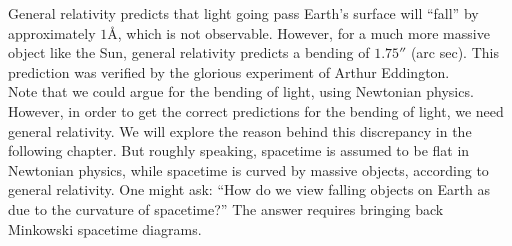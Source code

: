 \documentclass{article}
\theoremstyle{definition}
\begin{document}
General relativity predicts that light going pass Earth's surface will ``fall'' by approximately $1 \text{\AA}$, which is not observable. However, for a much more massive object like the Sun, general relativity predicts a bending of $1.75''$ (arc sec). This prediction was verified by the glorious experiment of Arthur Eddington.\\

Note that we could argue for the bending of light, using Newtonian physics. However, in order to get the correct predictions for the bending of light, we need general relativity. We will explore the reason behind this discrepancy in the following chapter. But roughly speaking, spacetime is assumed to be flat in Newtonian physics, while spacetime is curved by massive objects, according to general relativity. One might ask: ``How do we view falling objects on Earth as due to the curvature of spacetime?'' The answer requires bringing back Minkowski spacetime diagrams.
\end{document}
